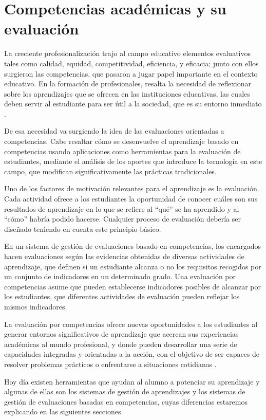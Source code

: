 \section{Competencias académicas y su evaluación}
La creciente profesionalización trajo al campo educativo elementos evaluativos tales como calidad, equidad, competitividad, eficiencia, y eficacia; junto con ellos surgieron las competencias, que pasaron a jugar papel importante en el contexto educativo. En la formación de profesionales, resalta la necesidad de reflexionar sobre los aprendizajes que se ofrecen en las instituciones educativas, las cuales deben servir al estudiante para ser útil a la sociedad, que es su entorno inmediato \citep{kuh_using_2015}.

De esa necesidad va surgiendo la idea de las evaluaciones orientadas a competencias. Cabe resaltar cómo se desenvuelve el aprendizaje basado en competencias usando aplicaciones como herramientas para la evaluación de estudiantes, mediante el análisis de los aportes que introduce la tecnología en este campo, que modifican significativamente las prácticas tradicionales\citep{carriveau_connecting_2016}.

Uno de los factores de motivación relevantes para el aprendizaje es la evaluación. Cada actividad ofrece a los estudiantes la oportunidad de conocer cuáles son sus resultados de aprendizaje en lo que se refiere al \enquote{qué} se ha aprendido y al \enquote{cómo} habría podido hacerse. Cualquier proceso de evaluación debería ser diseñado teniendo en cuenta este principio básico.

En un sistema de gestión de evaluaciones basado en competencias, los encargados hacen evaluaciones según las evidencias obtenidas de diversas actividades de aprendizaje, que definen si un estudiante alcanza o no los requisitos recogidos por un conjunto de indicadores en un determinado grado. Una evaluación por competencias asume que pueden establecerse indicadores posibles de alcanzar por los estudiantes, que diferentes actividades de evaluación pueden reflejar los mismos indicadores\citep{barrio_minton_evaluating_2016}.

La evaluación por competencias ofrece nuevas oportunidades a los estudiantes al generar entornos significativos de aprendizaje que acercan sus experiencias académicas al mundo profesional, y donde pueden desarrollar una serie de capacidades integradas y orientadas a la acción, con el objetivo de ser capaces de resolver problemas prácticos o enfrentarse a situaciones cotidianas \citep{carriveau_connecting_2016}.

Hoy día existen herramientas que ayudan al alumno a potenciar su aprendizaje y algunas de ellas son los sistemas de gestión de aprendizajes y los sistemas de gestión de evaluaciones basadas en competencias, cuyas diferencias estaremos explicando en las siguientes secciones